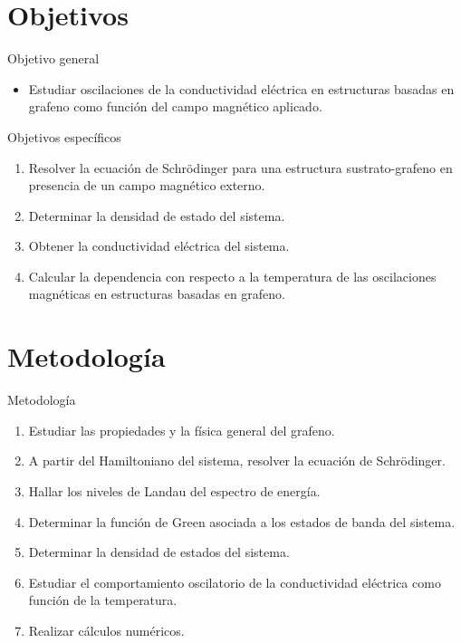 	\section{Objetivos}
		\begin{frame}{Objetivo general}
			\justifying
			\begin{itemize}
    		\item Estudiar oscilaciones de la conductividad eléctrica en estructuras basadas en grafeno como función del campo magnético aplicado.
				\end{itemize}
		\end{frame}

		\begin{frame}{Objetivos específicos}
			\justifying
			\begin{enumerate}
			    \item Resolver la ecuación de Schrödinger para una estructura sustrato-grafeno en presencia de un campo magnético externo.
			    \item<2-> Determinar la densidad de estado del sistema.
			    \item<3-> Obtener la conductividad eléctrica del sistema.
			    \item<4-> Calcular la dependencia con respecto a la temperatura de las oscilaciones magnéticas en estructuras basadas en grafeno.
			\end{enumerate}

		\end{frame}

	\section{Metodología}
		\begin{frame}{Metodología}
			\justifying
			\begin{enumerate}
				\item Estudiar las propiedades y la f\'isica general del grafeno.
				\item<2-> A partir del Hamiltoniano del sistema, resolver la ecuaci\'on de Schrödinger.
				\item<3-> Hallar los niveles de Landau del espectro de energ\'ia.
				\item<4-> Determinar la funci\'on de Green asociada a los estados de banda del sistema.
				\item<5-> Determinar la densidad de estados del sistema.
				\item<6-> Estudiar el comportamiento oscilatorio de la conductividad el\'ectrica como funci\'on de la temperatura.
				\item<7-> Realizar c\'alculos num\'ericos.
			\end{enumerate}
		\end{frame}
